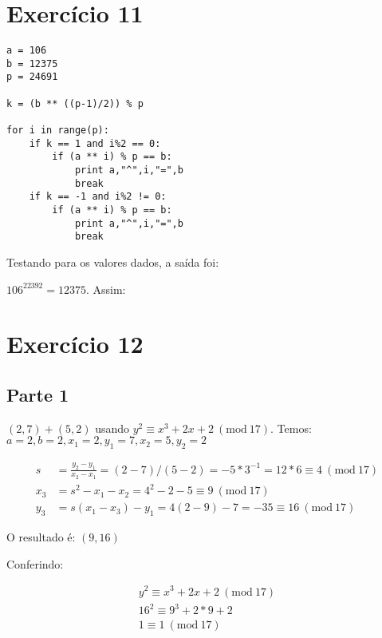 \documentclass[a4paper]{article}
\newcommand{\Mod}[1]{\ (\mathrm{mod}\ #1)}
\begin{document}
\section{Exercício 11}\label{sec:Ex11}

\begin{lstlisting}
a = 106
b = 12375
p = 24691

k = (b ** ((p-1)/2)) % p

for i in range(p):
    if k == 1 and i%2 == 0:
        if (a ** i) % p == b:
            print a,"^",i,"=",b
            break
    if k == -1 and i%2 != 0:
        if (a ** i) % p == b:
            print a,"^",i,"=",b
            break
\end{lstlisting}

Testando para os valores dados, a saída foi:

$106^{22392} = 12375$. Assim: 

\section{Exercício 12}\label{sec:Ex12}

\subsection{Parte 1}
$(2, 7) + (5, 2)$ usando $y^2 \equiv x^3 + 2x + 2 \Mod{17}$. 
\newline
\newline
Temos: $a = 2, b = 2, x_1 = 2, y_1 = 7, x_2 = 5, y_2 = 2$

\begin{equation}
  \label{eq:t}
  \begin{align*}
    s &= \frac{y_2 - y_1}{x_2 - x_1} = (2 - 7)/(5 - 2) = -5 * 3^{-1} = 12 * 6 \equiv 4 \Mod{17}\\
    x_3 &= s^2 - x_1 - x_2 = 4^2 - 2 - 5 \equiv 9 \Mod{17}\\
    y_3 &= s(x_1 - x_3) - y_1 = 4(2 - 9) - 7 = -35 \equiv 16 \Mod{17}
  \end{align*}
\end{equation}

O resultado é: $(9, 16)$

Conferindo:

\begin{equation}
  \label{eq:t}
  \begin{align*}
    y^2 \equiv x^3 + 2x + 2 \Mod{17}\\
    16^2 \equiv 9^3 + 2*9 + 2 \\
    1 \equiv 1 \Mod{17}
  \end{align*}
\end{equation}
\end{document}
